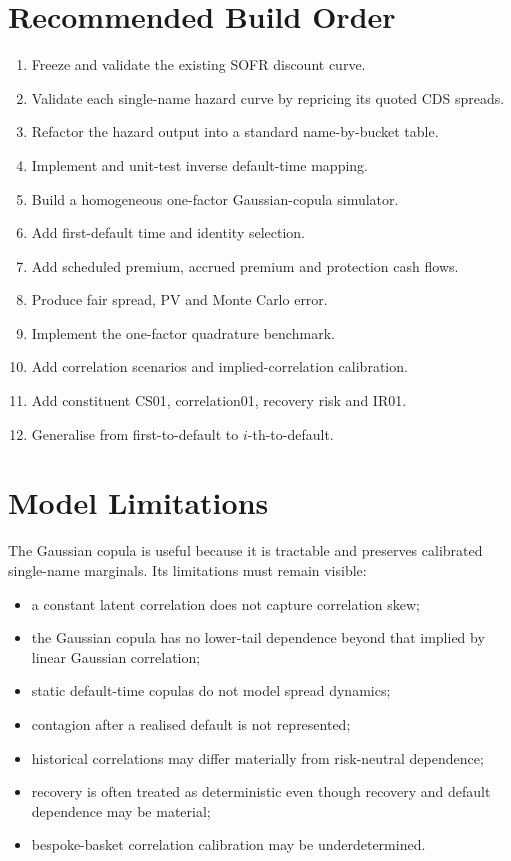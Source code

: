 \documentclass[11pt,a4paper]{article}
\begin{document}
\section{Recommended Build Order}

\begin{enumerate}
    \item Freeze and validate the existing SOFR discount curve.
    \item Validate each single-name hazard curve by repricing its quoted CDS spreads.
    \item Refactor the hazard output into a standard name-by-bucket table.
    \item Implement and unit-test inverse default-time mapping.
    \item Build a homogeneous one-factor Gaussian-copula simulator.
    \item Add first-default time and identity selection.
    \item Add scheduled premium, accrued premium and protection cash flows.
    \item Produce fair spread, PV and Monte Carlo error.
    \item Implement the one-factor quadrature benchmark.
    \item Add correlation scenarios and implied-correlation calibration.
    \item Add constituent CS01, correlation01, recovery risk and IR01.
    \item Generalise from first-to-default to $i$-th-to-default.
\end{enumerate}

\section{Model Limitations}

The Gaussian copula is useful because it is tractable and preserves calibrated single-name marginals. Its limitations must remain visible:

\begin{itemize}
    \item a constant latent correlation does not capture correlation skew;
    \item the Gaussian copula has no lower-tail dependence beyond that implied by linear Gaussian correlation;
    \item static default-time copulas do not model spread dynamics;
    \item contagion after a realised default is not represented;
    \item historical correlations may differ materially from risk-neutral dependence;
    \item recovery is often treated as deterministic even though recovery and default dependence may be material;
    \item bespoke-basket correlation calibration may be underdetermined.
\end{itemize}
\end{document}
